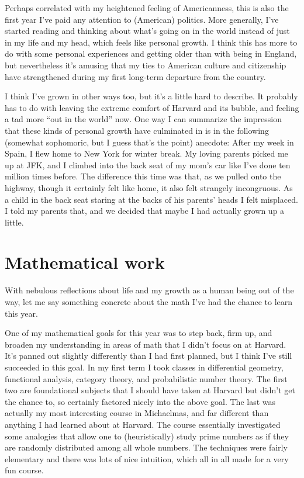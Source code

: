 Perhaps correlated with my heightened feeling of Americanness, this is also the first year I've paid any attention to (American) politics. More generally, I've started reading and thinking about what's going on in the world instead of just in my life and my head, which feels like personal growth. I think this has more to do with some personal experiences and getting older than with being in England, but nevertheless it's amusing that my ties to American culture and citizenship have strengthened during my first long-term departure from the country.

I think I've grown in other ways too, but it's a little hard to describe. It probably has to do with leaving the extreme comfort of Harvard and its bubble, and feeling a tad more ``out in the world'' now. One way I can summarize the impression that these kinds of personal growth have culminated in is in the following (somewhat sophomoric, but I guess that's the point) anecdote: After my week in Spain, I flew home to New York for winter break. My loving parents picked me up at JFK, and I climbed into the back seat of my mom's car like I've done ten million times before. The difference this time was that, as we pulled onto the highway, though it certainly felt like home, it also felt strangely incongruous. As a child in the back seat staring at the backs of his parents' heads I felt misplaced. I told my parents that, and we decided that maybe I had actually grown up a little.


\section*{Mathematical work}

With nebulous reflections about life and my growth as a human being out of the way, let me say something concrete about the math I've had the chance to learn this year.

One of my mathematical goals for this year was to step back, firm up, and broaden my understanding in areas of math that I didn't focus on at Harvard. It's panned out slightly differently than I had first planned, but I think I've still succeeded in this goal. In my first term I took classes in differential geometry, functional analysis, category theory, and probabilistic number theory. The first two are foundational subjects that I should have taken at Harvard but didn't get the chance to, so certainly factored nicely into the above goal. The last was actually my most interesting course in Michaelmas, and far different than anything I had learned about at Harvard. The course essentially investigated some analogies that allow one to (heuristically) study prime numbers as if they are randomly distributed among all whole numbers. The techniques were fairly elementary and there was lots of nice intuition, which all in all made for a very fun course.

